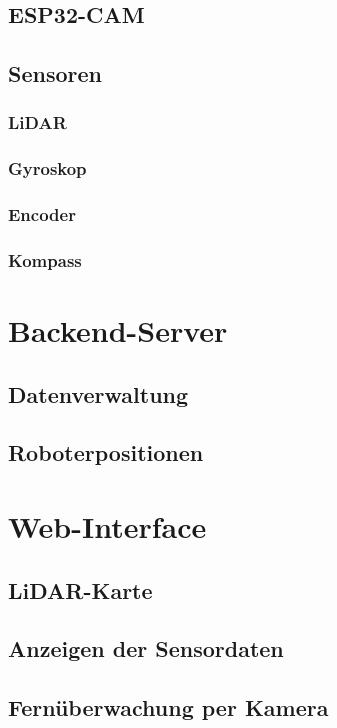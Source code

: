\documentclass[12pt]{article}
\begin{document}
	\subsection{ESP32-CAM}
	\subsection{Sensoren}
	\subsubsection{LiDAR}
	\subsubsection{Gyroskop}
	\subsubsection{Encoder}
	\subsubsection{Kompass}
	\section{Backend-Server}
	\subsection{Datenverwaltung}
	\subsection{Roboterpositionen}
	\section{Web-Interface}
	\subsection{LiDAR-Karte}
	\subsection{Anzeigen der Sensordaten}
	\subsection{Fernüberwachung per Kamera}
	

	\newpage
	\begin{appendix}
		\listoffigures
		\listoftables
	\end{appendix}
	\vspace{1cm}
\end{document}
